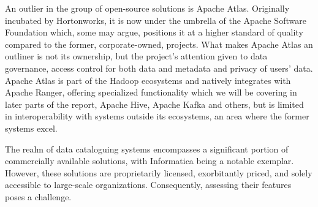 An outlier in the group of open-source solutions is Apache Atlas. Originally incubated by Hortonworks, it is now under the umbrella of the Apache Software Foundation which, some may argue, positions it at a higher standard of quality compared to the former, corporate-owned, projects. What makes Apache Atlas an outliner is not its ownership, but the project's attention given to data governance, access control for both data and metadata and privacy of users' data. Apache Atlas is part of the Hadoop ecosystems and natively integrates with Apache Ranger, offering specialized functionality which we will be covering in later parts of the report, Apache Hive, Apache Kafka and others, but is limited in interoperability with systems outside its ecosystems, an area where the former systems excel.

The realm of data cataloguing systems encompasses a significant portion of commercially available solutions, with Informatica being a notable exemplar. However, these solutions are proprietarily licensed, exorbitantly priced, and solely accessible to large-scale organizations. Consequently, assessing their features poses a challenge.
